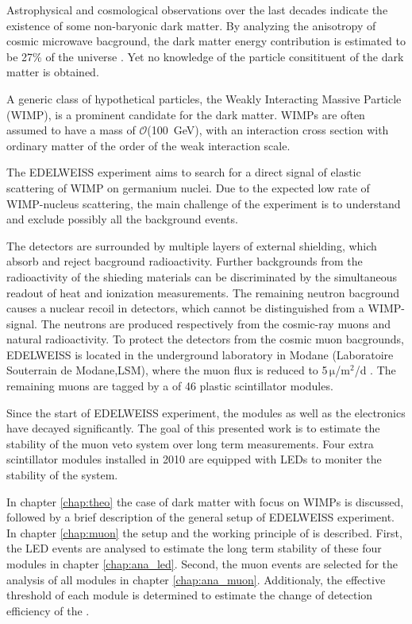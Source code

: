 Astrophysical and cosmological observations over the last decades indicate the existence of some non-baryonic dark matter. By analyzing the anisotropy of cosmic microwave bacground, the dark matter energy contribution is estimated to be 27\% of the universe \cite{Ade16}. Yet no knowledge of the particle consitituent of the dark matter is obtained.

A generic class of hypothetical particles, the Weakly Interacting Massive Particle (WIMP), is a prominent candidate for the dark matter. WIMPs are often assumed to have a mass of $\mathcal{O}$(\SI{100}{GeV}), with an interaction cross section with ordinary matter of the order of the weak interaction scale.

The EDELWEISS experiment aims to search for a direct signal of elastic scattering of WIMP on germanium nuclei. Due to the expected low rate of WIMP-nucleus scattering, the main challenge of the experiment is to understand and exclude possibly all the background events.

The detectors are surrounded by multiple layers of external shielding, which absorb and reject bacground radioactivity. Further backgrounds from the radioactivity of the shieding materials can be discriminated by the simultaneous readout of heat and ionization measurements. The remaining neutron bacground causes a nuclear recoil in detectors, which cannot be distinguished from a WIMP-signal. The neutrons are produced respectively from the cosmic-ray muons and natural radioactivity. To protect the detectors from the cosmic muon bacgrounds, EDELWEISS is located in the underground laboratory in Modane (Laboratoire Souterrain de Modane,LSM), where the muon flux is reduced to 5\,$\mathrm{\mu}$/$\mathrm{m}^{2}$/d \cite{Sch13a}. The remaining muons are tagged by a \mvs of 46 plastic scintillator modules.

Since the start of EDELWEISS experiment, the modules as well as the electronics have decayed significantly. The goal of this presented work is to estimate the stability of the muon veto system over long term measurements. Four extra scintillator modules installed in 2010 are equipped with LEDs to moniter the stability of the system.

In chapter \ref{chap:theo} the case of dark matter with focus on WIMPs is discussed, followed by a brief description of the general setup of EDELWEISS experiment. In chapter \ref{chap:muon} the setup and the working principle of \mvs is described. First, the LED events are analysed to estimate the long term stability of these four modules in chapter \ref{chap:ana_led}. Second, the muon events are selected for the analysis of all modules in chapter \ref{chap:ana_muon}. Additionaly, the effective threshold of each module is determined to estimate the change of detection efficiency of the \mvs.
